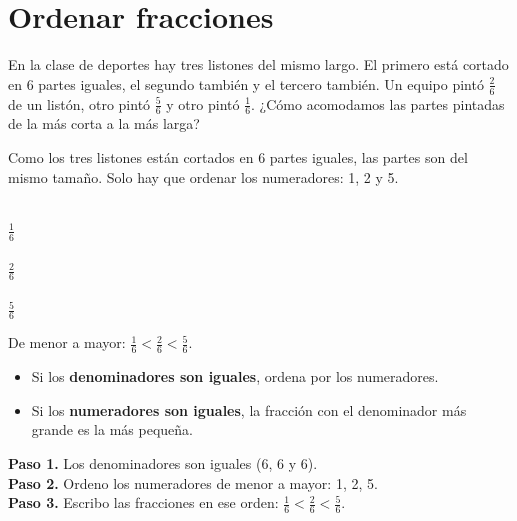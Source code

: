\section{Ordenar fracciones}

En la clase de deportes hay tres listones del mismo largo. El primero está cortado en 6 partes iguales, el segundo también y el tercero también. Un equipo pintó $\frac{2}{6}$ de un listón, otro pintó $\frac{5}{6}$ y otro pintó $\frac{1}{6}$. ¿Cómo acomodamos las partes pintadas de la más corta a la más larga?

Como los tres listones están cortados en 6 partes iguales, las partes son del mismo tamaño. Solo hay que ordenar los numeradores: 1, 2 y 5.

\begin{center}
\\[1mm]
$\frac{1}{6}$\\[3mm]
\\[1mm]
$\frac{2}{6}$\\[3mm]
\\[1mm]
$\frac{5}{6}$
\end{center}

De menor a mayor: $\frac{1}{6} < \frac{2}{6} < \frac{5}{6}$.

\begin{wbidea}
\begin{itemize}
\item Si los \textbf{denominadores son iguales}, ordena por los numeradores.
\item Si los \textbf{numeradores son iguales}, la fracción con el denominador más grande es la más pequeña.
\end{itemize}
\end{wbidea}

\begin{wbexample}
\textbf{Paso 1.} Los denominadores son iguales (6, 6 y 6).\\[1mm]
\textbf{Paso 2.} Ordeno los numeradores de menor a mayor: 1, 2, 5.\\[1mm]
\textbf{Paso 3.} Escribo las fracciones en ese orden: $\frac{1}{6} < \frac{2}{6} < \frac{5}{6}$.
\end{wbexample}

